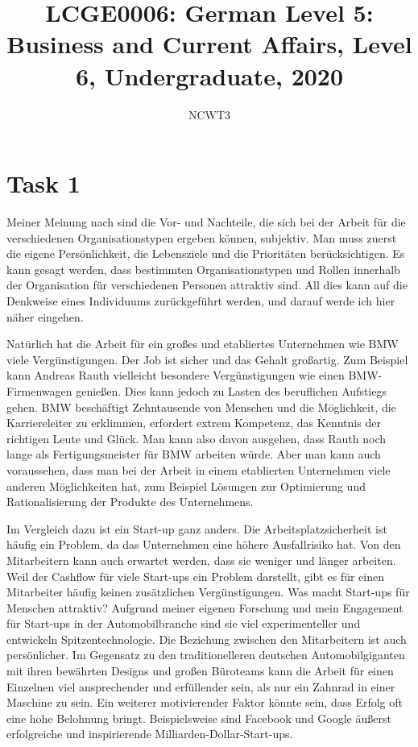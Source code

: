 \documentclass[11pt]{article}
\numberwithin{equation}{section}
\begin{document}
\title{\textbf{LCGE0006: German Level 5: Business and Current Affairs, Level 6, Undergraduate, 2020}}
\author{NCWT3}
\maketitle
\section*{Task 1}
Meiner Meinung nach sind die Vor- und Nachteile, die sich bei der Arbeit für die verschiedenen Organisationstypen ergeben können, subjektiv. Man muss zuerst die eigene Persönlichkeit, die Lebensziele und die Prioritäten berücksichtigen. Es kann gesagt werden, dass bestimmten Organisationstypen und Rollen innerhalb der Organisation für verschiedenen Personen attraktiv sind. All dies kann auf die Denkweise eines Individuums zurückgeführt werden, und darauf werde ich hier näher eingehen.

Natürlich hat die Arbeit für ein großes und etabliertes Unternehmen wie BMW viele Vergünstigungen. Der Job ist sicher und das Gehalt großartig. Zum Beispiel kann Andreas Rauth vielleicht besondere Vergünstigungen wie einen BMW-Firmenwagen genießen. Dies kann jedoch zu Lasten des beruflichen Aufstiegs gehen. BMW beschäftigt Zehntausende von Menschen und die Möglichkeit, die Karriereleiter zu erklimmen, erfordert extrem Kompetenz, das Kenntnis der richtigen Leute und Glück. Man kann also davon ausgehen, dass Rauth noch lange als Fertigungsmeister für BMW arbeiten würde. Aber man kann auch voraussehen, dass man bei der Arbeit in einem etablierten Unternehmen viele anderen Möglichkeiten hat, zum Beispiel Lösungen zur Optimierung und Rationalisierung der Produkte des Unternehmens.

Im Vergleich dazu ist ein Start-up ganz anders. Die Arbeitsplatzsicherheit ist häufig ein Problem, da das Unternehmen eine höhere Ausfallrisiko hat. Von den Mitarbeitern kann auch erwartet werden, dass sie weniger und länger arbeiten. Weil der Cashflow für viele Start-ups ein Problem darstellt, gibt es für einen Mitarbeiter häufig keinen zusätzlichen Vergünstigungen. Was macht Start-ups für Menschen attraktiv? Aufgrund meiner eigenen Forschung und mein Engagement für Start-ups in der Automobilbranche sind sie viel experimenteller und entwickeln Spitzentechnologie. Die Beziehung zwischen den Mitarbeitern ist auch persönlicher. Im Gegensatz zu den traditionelleren deutschen Automobilgiganten mit ihren bewährten Designs und großen Büroteams kann die Arbeit für einen Einzelnen viel ansprechender und erfüllender sein, als nur ein Zahnrad in einer Maschine zu sein. Ein weiterer motivierender Faktor könnte sein, dass Erfolg oft eine hohe Belohnung bringt. Beispielsweise sind Facebook und Google äußerst erfolgreiche und inspirierende Milliarden-Dollar-Start-ups.
\end{document}
